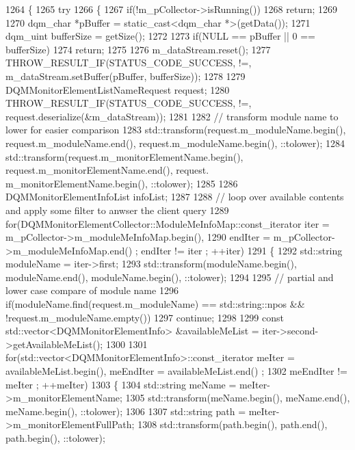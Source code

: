 \begin{DoxyCode}
1264 \{
1265   \textcolor{keywordflow}{try}
1266   \{
1267     \textcolor{keywordflow}{if}(!m_pCollector->isRunning())
1268       \textcolor{keywordflow}{return};
1269 
1270     dqm_char *pBuffer = \textcolor{keyword}{static\_cast<}dqm_char *\textcolor{keyword}{>}(getData());
1271     dqm_uint bufferSize = getSize();
1272 
1273     \textcolor{keywordflow}{if}(NULL == pBuffer || 0 == bufferSize)
1274       \textcolor{keywordflow}{return};
1275 
1276     m_dataStream.reset();
1277     THROW_RESULT_IF(STATUS\_CODE\_SUCCESS, !=, m_dataStream.setBuffer(pBuffer, bufferSize));
1278 
1279     DQMMonitorElementListNameRequest request;
1280     THROW_RESULT_IF(STATUS\_CODE\_SUCCESS, !=, request.deserialize(&m_dataStream));
1281 
1282     \textcolor{comment}{// transform module name to lower for easier comparison}
1283     std::transform(request.m\_moduleName.begin(), request.m\_moduleName.end(), request.m\_moduleName.begin(), 
      ::tolower);
1284     std::transform(request.m\_monitorElementName.begin(), request.m\_monitorElementName.end(), request.
      m\_monitorElementName.begin(), ::tolower);
1285 
1286     DQMMonitorElementInfoList infoList;
1287 
1288     \textcolor{comment}{// loop over available contents and apply some filter to anwser the client query}
1289     \textcolor{keywordflow}{for}(DQMMonitorElementCollector::ModuleMeInfoMap::const\_iterator iter = 
      m_pCollector->m_moduleMeInfoMap.begin(),
1290         endIter = m_pCollector->m_moduleMeInfoMap.end() ; endIter != iter ; ++iter)
1291     \{
1292       std::string moduleName = iter->first;
1293       std::transform(moduleName.begin(), moduleName.end(), moduleName.begin(), ::tolower);
1294 
1295       \textcolor{comment}{// partial and lower case compare of module name}
1296       \textcolor{keywordflow}{if}(moduleName.find(request.m\_moduleName) == std::string::npos && !request.m\_moduleName.empty())
1297         \textcolor{keywordflow}{continue};
1298 
1299       \textcolor{keyword}{const} std::vector<DQMMonitorElementInfo> &availableMeList = iter->second->getAvailableMeList();
1300 
1301       \textcolor{keywordflow}{for}(std::vector<DQMMonitorElementInfo>::const\_iterator meIter = availableMeList.begin(), meEndIter = 
      availableMeList.end() ;
1302           meEndIter != meIter ; ++meIter)
1303       \{
1304         std::string meName = meIter->m\_monitorElementName;
1305         std::transform(meName.begin(), meName.end(), meName.begin(), ::tolower);
1306 
1307         std::string path = meIter->m\_monitorElementFullPath;
1308         std::transform(path.begin(), path.end(), path.begin(), ::tolower);

\end{DoxyCode}

